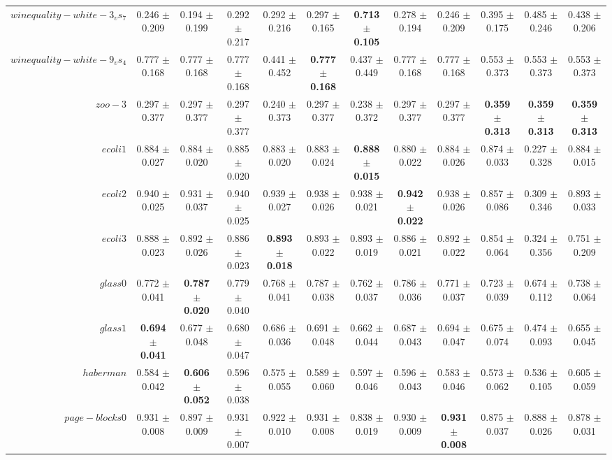 \begin{table}[!ht]
{\begin{tabular}{r c c c c c c c c c c c}
$winequality-white-3_vs_7$ & 0.246 $\pm$ 0.209 & 0.194 $\pm$ 0.199 & 0.292 $\pm$ 0.217 & 0.292 $\pm$ 0.216 & 0.297 $\pm$ 0.165 & \textbf{0.713 $\pm$ 0.105} & 0.278 $\pm$ 0.194 & 0.246 $\pm$ 0.209 & 0.395 $\pm$ 0.175 & 0.485 $\pm$ 0.246 & 0.438 $\pm$ 0.206 \\
$winequality-white-9_vs_4$ & 0.777 $\pm$ 0.168 & 0.777 $\pm$ 0.168 & 0.777 $\pm$ 0.168 & 0.441 $\pm$ 0.452 & \textbf{0.777 $\pm$ 0.168} & 0.437 $\pm$ 0.449 & 0.777 $\pm$ 0.168 & 0.777 $\pm$ 0.168 & 0.553 $\pm$ 0.373 & 0.553 $\pm$ 0.373 & 0.553 $\pm$ 0.373 \\
$zoo-3$ & 0.297 $\pm$ 0.377 & 0.297 $\pm$ 0.377 & 0.297 $\pm$ 0.377 & 0.240 $\pm$ 0.373 & 0.297 $\pm$ 0.377 & 0.238 $\pm$ 0.372 & 0.297 $\pm$ 0.377 & 0.297 $\pm$ 0.377 & \textbf{0.359 $\pm$ 0.313} & \textbf{0.359 $\pm$ 0.313} & \textbf{0.359 $\pm$ 0.313} \\
$ecoli1$ & 0.884 $\pm$ 0.027 & 0.884 $\pm$ 0.020 & 0.885 $\pm$ 0.020 & 0.883 $\pm$ 0.020 & 0.883 $\pm$ 0.024 & \textbf{0.888 $\pm$ 0.015} & 0.880 $\pm$ 0.022 & 0.884 $\pm$ 0.026 & 0.874 $\pm$ 0.033 & 0.227 $\pm$ 0.328 & 0.884 $\pm$ 0.015 \\
$ecoli2$ & 0.940 $\pm$ 0.025 & 0.931 $\pm$ 0.037 & 0.940 $\pm$ 0.025 & 0.939 $\pm$ 0.027 & 0.938 $\pm$ 0.026 & 0.938 $\pm$ 0.021 & \textbf{0.942 $\pm$ 0.022} & 0.938 $\pm$ 0.026 & 0.857 $\pm$ 0.086 & 0.309 $\pm$ 0.346 & 0.893 $\pm$ 0.033 \\
$ecoli3$ & 0.888 $\pm$ 0.023 & 0.892 $\pm$ 0.026 & 0.886 $\pm$ 0.023 & \textbf{0.893 $\pm$ 0.018} & 0.893 $\pm$ 0.022 & 0.893 $\pm$ 0.019 & 0.886 $\pm$ 0.021 & 0.892 $\pm$ 0.022 & 0.854 $\pm$ 0.064 & 0.324 $\pm$ 0.356 & 0.751 $\pm$ 0.209 \\
$glass0$ & 0.772 $\pm$ 0.041 & \textbf{0.787 $\pm$ 0.020} & 0.779 $\pm$ 0.040 & 0.768 $\pm$ 0.041 & 0.787 $\pm$ 0.038 & 0.762 $\pm$ 0.037 & 0.786 $\pm$ 0.036 & 0.771 $\pm$ 0.037 & 0.723 $\pm$ 0.039 & 0.674 $\pm$ 0.112 & 0.738 $\pm$ 0.064 \\
$glass1$ & \textbf{0.694 $\pm$ 0.041} & 0.677 $\pm$ 0.048 & 0.680 $\pm$ 0.047 & 0.686 $\pm$ 0.036 & 0.691 $\pm$ 0.048 & 0.662 $\pm$ 0.044 & 0.687 $\pm$ 0.043 & 0.694 $\pm$ 0.047 & 0.675 $\pm$ 0.074 & 0.474 $\pm$ 0.093 & 0.655 $\pm$ 0.045 \\
$haberman$ & 0.584 $\pm$ 0.042 & \textbf{0.606 $\pm$ 0.052} & 0.596 $\pm$ 0.038 & 0.575 $\pm$ 0.055 & 0.589 $\pm$ 0.060 & 0.597 $\pm$ 0.046 & 0.596 $\pm$ 0.043 & 0.583 $\pm$ 0.046 & 0.573 $\pm$ 0.062 & 0.536 $\pm$ 0.105 & 0.605 $\pm$ 0.059 \\
$page-blocks0$ & 0.931 $\pm$ 0.008 & 0.897 $\pm$ 0.009 & 0.931 $\pm$ 0.007 & 0.922 $\pm$ 0.010 & 0.931 $\pm$ 0.008 & 0.838 $\pm$ 0.019 & 0.930 $\pm$ 0.009 & \textbf{0.931 $\pm$ 0.008} & 0.875 $\pm$ 0.037 & 0.888 $\pm$ 0.026 & 0.878 $\pm$ 0.031 \\

\end{tabular}}
\end{table}
